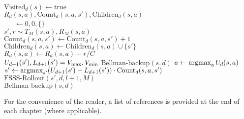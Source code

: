 \begin{algorithm}[tb]
	\caption{$\mbox{FSSS-Rollout}(s, d, l, M)$}
	\label{alg:fs3-rollout}
	 {
		\Return
	}
	 {
		$\mbox{Visited}_d(s) \leftarrow \mbox{true}$\\
		 {
			$R_d(s,a),\mbox{Count}_d(s,a,s'),\mbox{Children}_d(s,a)$\\
			\ \ \ $\leftarrow 0, 0, \{\}$\\
			 {
				$s', r \sim T_M(s, a), R_M(s,a)$ \\
				$\mbox{Count}_d(s,a,s') \leftarrow \mbox{Count}_d(s,a,s') + 1$ \\
				$\mbox{Children}_d(s,a) \leftarrow \mbox{Children}_d(s,a) \cup \{s'\}$ \\
				$R_d(s,a) \leftarrow R_d(s, a)+r/C$\\
				 {
					 $U_{d+1}(s'), L_{d+1}(s') = V_{\rm max}, V_{\rm min}$
				}
			}
		}
		$\mbox{Bellman-backup}(s, d)$
	}
	$a \leftarrow \argmax_a U_d(s,a)$\\
	$s' \leftarrow \argmax_{s'} (U_{d+1}(s')-L_{d+1}(s')) \cdot \mbox{Count}_d(s,a,s')$\\
	$\mbox{FSSS-Rollout}(s', d, l+1, M)$\\
	$\mbox{Bellman-backup}(s, d)$\\
	\Return
\end{algorithm}


%
\ifperchapterbib%
For the convenience of the reader, a list of references is provided at the end of each chapter (where applicable).
\ifendbib%
\else\fi%
\else\fi%
